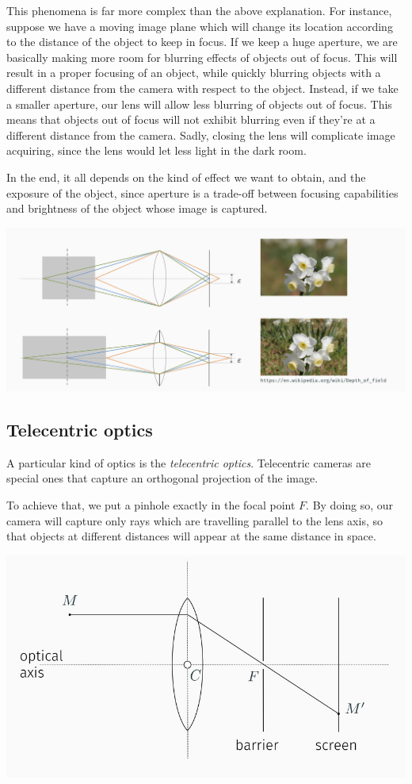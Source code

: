\documentclass[10pt]{report}
\begin{document}
This phenomena is far more complex than the above explanation. For
instance, suppose we have a moving image plane which will change its
location according to the distance of the object to keep in focus. If we
keep a huge aperture, we are basically making more room for blurring
effects of objects out of focus. This will result in a proper focusing
of an object, while quickly blurring objects with a different distance
from the camera with respect to the object. Instead, if we take a
smaller aperture, our lens will allow less blurring of objects out of
focus. This means that objects out of focus will not exhibit blurring
even if they're at a different distance from the camera. Sadly, closing
the lens will complicate image acquiring, since the lens would let less
light in the dark room.

In the end, it all depends on the kind of effect we want to obtain, and
the exposure of the object, since aperture is a trade-off between
focusing capabilities and brightness of the object whose image is
captured.

\begin{center}
\includegraphics[width=.9\linewidth]{./pics/visio/focusing-blur.jpg}
\end{center}

\subsection{Telecentric optics}
\label{telecentric-optics}
A particular kind of optics is the \emph{telecentric optics}. Telecentric
cameras are special ones that capture an orthogonal projection of the
image.

To achieve that, we put a pinhole exactly in the focal point \(F\). By
doing so, our camera will capture only rays which are travelling
parallel to the lens axis, so that objects at different distances will
appear at the same distance in space.

\begin{center}
\includegraphics[width=.9\linewidth]{./pics/visio/telecentric-optics.jpg}
\end{center}
\end{document}
